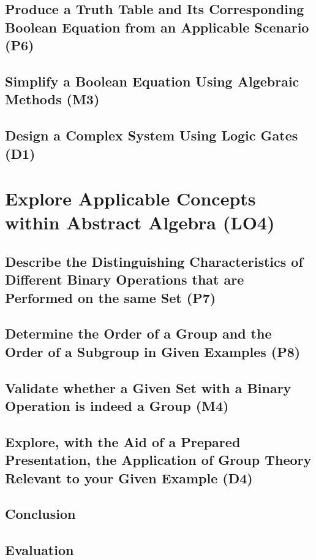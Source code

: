 \documentclass[12pt, a4paper, twoside]{report} %
\begin{document}



\section{Produce a Truth Table and Its Corresponding Boolean Equation from an Applicable Scenario (P6)}
\label{sec:P6}

\section{Simplify a Boolean Equation Using Algebraic Methods (M3)}
\label{sec:M3}

\section{Design a Complex System Using Logic Gates (D1)}
\label{sec:D1}

\chapter{Explore Applicable Concepts within Abstract Algebra (LO4)}
\label{chap:LO4}

\section{Describe the Distinguishing Characteristics of Different Binary Operations that are Performed on the same Set (P7)}
\label{sec:P7}

\section{Determine the Order of a Group and the Order of a Subgroup in Given Examples (P8)}
\label{sec:P8}

\section{Validate whether a Given Set with a Binary Operation is indeed a Group (M4)}
\label{sec:M4}

\section{Explore, with the Aid of a Prepared Presentation, the Application of Group Theory Relevant to your Given Example (D4)}
\label{sec:D4}



\newpage
\section*{Conclusion}
\newpage
\section*{Evaluation}

\end{document}
